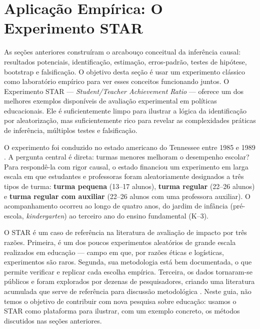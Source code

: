 
\chapter{Aplicação Empírica: O Experimento STAR}
\label{sec:star}
\label{cap:star}

As seções anteriores construíram o arcabouço conceitual da inferência causal: resultados potenciais, identificação, estimação, erros-padrão, testes de hipótese, bootstrap e falsificação. O objetivo desta seção é usar um experimento clássico como laboratório empírico para ver esses conceitos funcionando juntos. O Experimento STAR --- \textit{Student/Teacher Achievement Ratio} --- oferece um dos melhores exemplos disponíveis de avaliação experimental em políticas educacionais. Ele é suficientemente limpo para ilustrar a lógica da identificação por aleatorização, mas suficientemente rico para revelar as complexidades práticas de inferência, múltiplos testes e falsificação.

O experimento foi conduzido no estado americano do Tennessee entre 1985 e 1989 \citep{Finn1990, Krueger1999}. A pergunta central é direta: turmas menores melhoram o desempenho escolar? Para respondê-la com rigor causal, o estado financiou um experimento em larga escala em que estudantes e professoras foram aleatoriamente designados a três tipos de turma: \textbf{turma pequena} (13--17 alunos), \textbf{turma regular} (22--26 alunos) e \textbf{turma regular com auxiliar} (22--26 alunos com uma professora auxiliar). O acompanhamento ocorreu ao longo de quatro anos, do jardim de infância (pré-escola, \textit{kindergarten}) ao terceiro ano do ensino fundamental (K--3).

O STAR é um caso de referência na literatura de avaliação de impacto por três razões. Primeira, é um dos poucos experimentos aleatórios de grande escala realizados em educação --- campo em que, por razões éticas e logísticas, experimentos são raros. Segunda, sua metodologia está bem documentada, o que permite verificar e replicar cada escolha empírica. Terceira, os dados tornaram-se públicos e foram explorados por dezenas de pesquisadores, criando uma literatura acumulada que serve de referência para discussão metodológica \citep{Chetty2011}. Neste guia, não temos o objetivo de contribuir com nova pesquisa sobre educação: usamos o STAR como plataforma para ilustrar, com um exemplo concreto, os métodos discutidos nas seções anteriores.


